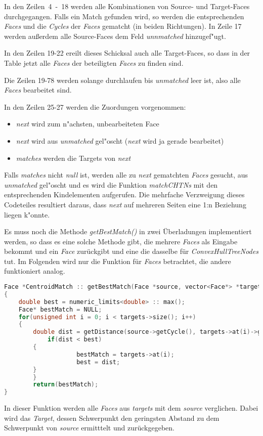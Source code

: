 In den Zeilen~4~-~18 werden alle Kombinationen von Source- und Target-Faces durchgegangen. Falls ein Match gefunden wird, so werden die entsprechenden \textit{Faces} und die \textit{Cycles} der \textit{Faces} gematcht (in beiden Richtungen). In Zeile 17 werden außerdem alle Source-Faces dem Feld \textit{unnmatched} hinzugef"ugt.

In den Zeilen 19-22 ereilt dieses Schicksal auch alle Target-Faces, so dass in der Table jetzt alle \textit{Faces} der beteiligten \textit{Faces} zu finden sind.

Die Zeilen 19-78 werden solange durchlaufen bis \textit{unmatched} leer ist, also alle \textit{Faces} bearbeitet sind.

In den Zeilen 25-27 werden die Zuordungen vorgenommen:
\begin{itemize}
\item \textit{next} wird zum n"achsten, unbearbeiteten Face
\item \textit{next} wird aus \textit{unmatched} gel"oscht (\textit{next} wird ja gerade bearbeitet)
\item \textit{matches} werden die Targets von \textit{next}
\end{itemize} 

Falls \textit{matches} nicht \textit{null} ist, werden alle zu \textit{next} gematchten \textit{Faces} gesucht, aus \textit{unmatched} gel"oscht und es wird die Funktion \textit{matchCHTNs} mit den entsprechenden Kindelementen aufgerufen. Die mehrfache Verzweigung dieses Codeteiles resultiert daraus, dass \textit{next} auf mehreren Seiten eine 1:n Beziehung liegen k"onnte. 

Es muss noch die Methode \textit{getBestMatch()} in zwei Überladungen implementiert werden, so dass es eine solche Methode gibt, die mehrere \textit{Faces} als Eingabe bekommt und ein \textit{Face} zurückgibt und eine die dasselbe für \textit{ConvexHullTreeNodes} tut. Im Folgenden wird nur die Funktion für \textit{Faces} betrachtet, die andere funktioniert analog.
\begin{lstlisting}[language=c++]
Face *CentroidMatch :: getBestMatch(Face *source, vector<Face*> *targets)
{
	double best = numeric_limits<double> :: max();
	Face* bestMatch = NULL;    
	for(unsigned int i = 0; i < targets->size(); i++)
	{    	    	
		double dist = getDistance(source->getCycle(), targets->at(i)->getCycle());        
        	if(dist < best)
		{
            		bestMatch = targets->at(i);
            		best = dist;
		}
    	}    
    	return(bestMatch);
}
\end{lstlisting}
In dieser Funktion werden alle \textit{Faces} aus \textit{targets} mit dem \textit{source} verglichen. Dabei wird das \textit{Target}, dessen Schwerpunkt den geringsten Abstand zu dem Schwerpunkt von \textit{source} ermitttelt und zurückgegeben.

